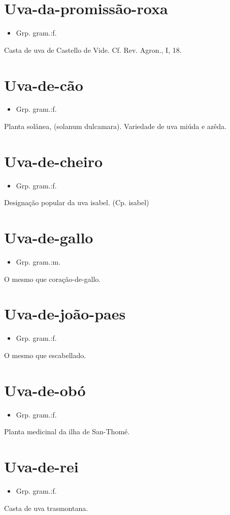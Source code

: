 \documentclass{article}
\begin{document}
\section{Uva-da-promissão-roxa}
\begin{itemize}
\item {Grp. gram.:f.}
\end{itemize}
Casta de uva de Castello de Vide. Cf. \textunderscore Rev. Agron.\textunderscore , I, 18.
\section{Uva-de-cão}
\begin{itemize}
\item {Grp. gram.:f.}
\end{itemize}
Planta solânea, (\textunderscore solanum dulcamara\textunderscore ).
Variedade de uva miúda e azêda.
\section{Uva-de-cheiro}
\begin{itemize}
\item {Grp. gram.:f.}
\end{itemize}
Designação popular da uva isabel.
(Cp. \textunderscore isabel\textunderscore )
\section{Uva-de-gallo}
\begin{itemize}
\item {Grp. gram.:m.}
\end{itemize}
O mesmo que \textunderscore coração-de-gallo\textunderscore .
\section{Uva-de-joão-paes}
\begin{itemize}
\item {Grp. gram.:f.}
\end{itemize}
O mesmo que \textunderscore escabellado\textunderscore .
\section{Uva-de-obó}
\begin{itemize}
\item {Grp. gram.:f.}
\end{itemize}
Planta medicinal da ilha de San-Thomé.
\section{Uva-de-rei}
\begin{itemize}
\item {Grp. gram.:f.}
\end{itemize}
Casta de uva trasmontana.
\end{document}
